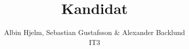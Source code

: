 \documentclass[a4paper]{article}
\title{Kandidat}
\author{Albin Hjelm, Sebastian Gustafsson & Alexander Backlund \\  IT3}
\begin{document}
\maketitle

\pagebreak
\end{document}
